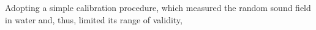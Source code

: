 %
Adopting
a simple calibration procedure, which measured
the random sound field in
water and, thus, limited
its range of
validity,
